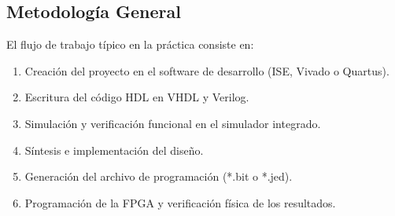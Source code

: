 \subsection*{Metodología General}
El flujo de trabajo típico en la práctica consiste en:
\begin{enumerate}
    \item Creación del proyecto en el software de desarrollo (ISE, Vivado o Quartus).
    \item Escritura del código HDL en VHDL y Verilog.
    \item Simulación y verificación funcional en el simulador integrado.
    \item Síntesis e implementación del diseño.
    \item Generación del archivo de programación (*.bit o *.jed).
    \item Programación de la FPGA y verificación física de los resultados.
\end{enumerate}